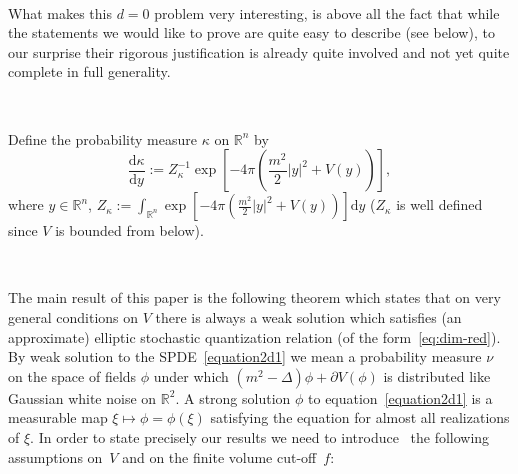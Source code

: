 \documentclass[a4paper,10pt]{article}
\newcommand{\assign}{:=}
\newcommand{\mathd}{\mathrm{d}}
\begin{document}
\

What makes this $d = 0$ problem very interesting, is above all the fact that
while the statements we would like to prove are quite easy to describe (see
below), to our surprise their rigorous justification is already quite involved
and not yet quite complete in full generality.

\

Define the probability measure $\kappa$ on $\mathbb{R}^n$ by
\begin{equation}
  \frac{\mathd \kappa}{\mathd y} \assign Z_{\kappa}^{- 1} \exp \left[ - 4 \pi
  \left( \frac{m^2}{2} | y |^2 + V (y) \right) \right], \label{eq:gibbs-kappa}
\end{equation}
where $y \in \mathbb{R}^n$, $Z_{\kappa} \assign \int_{\mathbb{R}^n} \exp
\left[ - 4 \pi \left( \frac{m^2}{2} | y |^2 + V (y) \right) \right] \mathd y$
($Z_{\kappa}$ is well defined since $V$ is bounded from below).

\

The main result of this paper is the following theorem which states that on
very general conditions on $V$ there is always a weak solution which satisfies
(an approximate) elliptic stochastic quantization relation (of the
form~{\eqref{eq:dim-red}}). By weak solution to the SPDE~{\eqref{equation2d1}}
we mean a probability measure $\nu$ on the space of fields $\phi$ under which
$(m^2 - \Delta) \phi + \partial V (\phi)$ is distributed like Gaussian white
noise on $\mathbb{R}^2$. A strong solution $\phi$ to
equation~{\eqref{equation2d1}} is a measurable map $\xi \mapsto \phi = \phi
(\xi)$ satisfying the equation for almost all realizations of $\xi$. In order
to state precisely our results we need to introduce \ the following
assumptions on~$V$ and on the finite volume cut-off~$f$:
\end{document}
